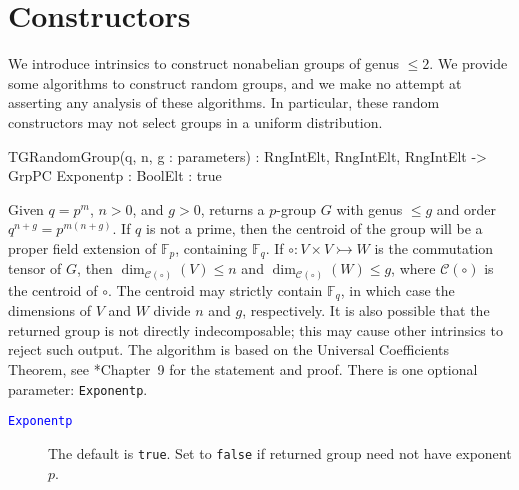 \documentclass{documentation}
\begin{document}
\chapter{Constructors}

We introduce intrinsics to construct nonabelian groups of genus $\leq 2$. 
We provide some algorithms to construct random groups, and we make no attempt at asserting any analysis of these algorithms.
In particular, these random constructors may not select groups in a uniform distribution. 

\begin{intrinsics}
TGRandomGroup(q, n, g : parameters) : RngIntElt, RngIntElt, RngIntElt -> GrpPC
    Exponentp : BoolElt : true
\end{intrinsics}

Given $q=p^m$, $n>0$, and $g>0$, returns a $p$-group $G$ with genus $\leq g$ and order $q^{n+g}=p^{m(n+g)}$. 
If $q$ is not a prime, then the centroid of the group will be a proper field extension of $\mathbb{F}_p$, containing $\mathbb{F}_q$. 
If $\circ: V\times V\rightarrowtail W$ is the commutation tensor of $G$, then $\dim_{\mathcal{C}(\circ)}(V)\leq n$ and $\dim_{\mathcal{C}(\circ)}(W)\leq g$, where $\mathcal{C}(\circ)$ is the centroid of $\circ$. The centroid may strictly contain $\mathbb{F}_q$, in which case the dimensions of $V$ and $W$ divide $n$ and $g$, respectively. It is also possible that the returned group is not directly indecomposable; this may cause other intrinsics to reject such output. 
The algorithm is based on the Universal Coefficients Theorem, see \cite{LGM:book}*{Chapter~9} for the statement and proof.
There is one optional parameter: \texttt{Exponentp}. 

\begin{description}
\item[\textcolor{blue}{\tt Exponentp}]
The default is \texttt{true}.
Set to \texttt{false} if returned group need not have exponent $p$.  
\end{description}
\end{document}
